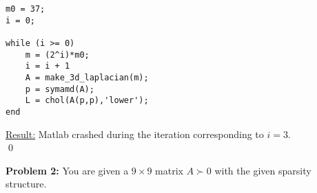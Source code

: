 \documentclass[12pt]{article}
\begin{document}
\begin{itemize}
\lstset{language=matlab,frame=single}
\begin{lstlisting}[caption=Matlab Code to for when 3D Cholesky Quits]
m0 = 37;
i = 0;

while (i >= 0)
    m = (2^i)*m0;
    i = i + 1
    A = make_3d_laplacian(m);
    p = symamd(A);
    L = chol(A(p,p),'lower');
end
\end{lstlisting}

\underline{Result:} Matlab crashed during the iteration corresponding to $i = 3$.\\
\qed
\end{itemize}


\bigskip\bigskip
\noindent
\textbf{Problem 2:}  You are given a $9 \times 9$ matrix $A \succ 0$ with the given sparsity structure.\\
\end{document}

